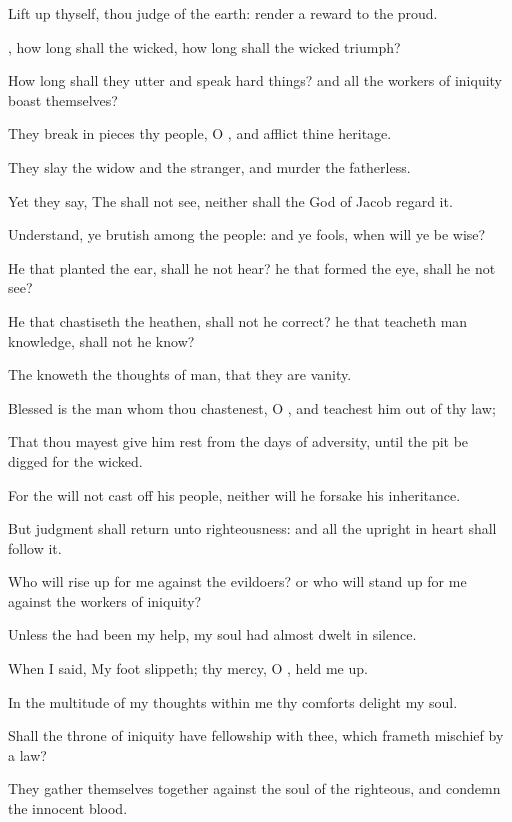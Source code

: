 \Verse Lift up thyself, thou judge of the earth: render a reward to the proud.

\Verse \LORD, how long shall the wicked, how long shall the wicked triumph?

\Verse How long shall they utter and speak hard things? and all the workers of iniquity boast themselves?

\Verse They break in pieces thy people, O \LORD, and afflict thine heritage.

\Verse They slay the widow and the stranger, and murder the fatherless.

\Verse Yet they say, The \LORD shall not see, neither shall the God of Jacob regard it.

\Verse Understand, ye brutish among the people: and ye fools, when will ye be wise?

\Verse He that planted the ear, shall he not hear? he that formed the eye, shall he not see?

\Verse He that chastiseth the heathen, shall not he correct? he that teacheth man knowledge, shall not he know?

\Verse The \LORD knoweth the thoughts of man, that they are vanity.

\Verse Blessed is the man whom thou chastenest, O \LORD, and teachest him out of thy law;

\Verse That thou mayest give him rest from the days of adversity, until the pit be digged for the wicked.

\Verse For the \LORD will not cast off his people, neither will he forsake his inheritance.

\Verse But judgment shall return unto righteousness: and all the upright in heart shall follow it.

\Verse Who will rise up for me against the evildoers? or who will stand up for me against the workers of iniquity?

\Verse Unless the \LORD had been my help, my soul had almost dwelt in silence.

\Verse When I said, My foot slippeth; thy mercy, O \LORD, held me up.

\Verse In the multitude of my thoughts within me thy comforts delight my soul.

\Verse Shall the throne of iniquity have fellowship with thee, which frameth mischief by a law?

\Verse They gather themselves together against the soul of the righteous, and condemn the innocent blood.

